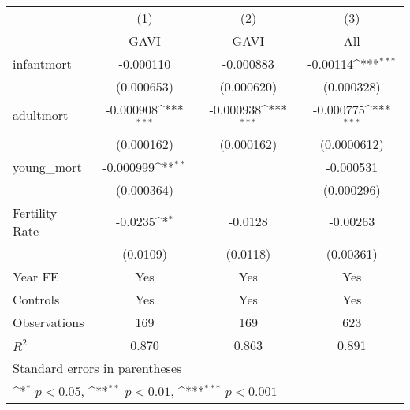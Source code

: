 {
\def\sym#1{\ifmmode^{#1}\else\(^{#1}\)\fi}
\begin{tabular}{l*{3}{c}}
\toprule
                &\multicolumn{1}{c}{(1)}&\multicolumn{1}{c}{(2)}&\multicolumn{1}{c}{(3)}\\
                &\multicolumn{1}{c}{GAVI}&\multicolumn{1}{c}{GAVI}&\multicolumn{1}{c}{All}\\
\midrule
infantmort      &-0.000110         &-0.000883         & -0.00114\sym{***}\\
                &(0.000653)         &(0.000620)         &(0.000328)         \\
\addlinespace
adultmort       &-0.000908\sym{***}&-0.000938\sym{***}&-0.000775\sym{***}\\
                &(0.000162)         &(0.000162)         &(0.0000612)         \\
\addlinespace
young\_mort      &-0.000999\sym{**} &                  &-0.000531         \\
                &(0.000364)         &                  &(0.000296)         \\
\addlinespace
Fertility Rate  &  -0.0235\sym{*}  &  -0.0128         & -0.00263         \\
                & (0.0109)         & (0.0118)         &(0.00361)         \\
\addlinespace
Year FE         &      Yes         &      Yes         &      Yes         \\
\addlinespace
Controls        &      Yes         &      Yes         &      Yes         \\
\midrule
Observations    &      169         &      169         &      623         \\
\(R^{2}\)       &    0.870         &    0.863         &    0.891         \\
\bottomrule
\multicolumn{4}{l}{\footnotesize Standard errors in parentheses}\\
\multicolumn{4}{l}{\footnotesize \sym{*} \(p<0.05\), \sym{**} \(p<0.01\), \sym{***} \(p<0.001\)}\\
\end{tabular}
}
